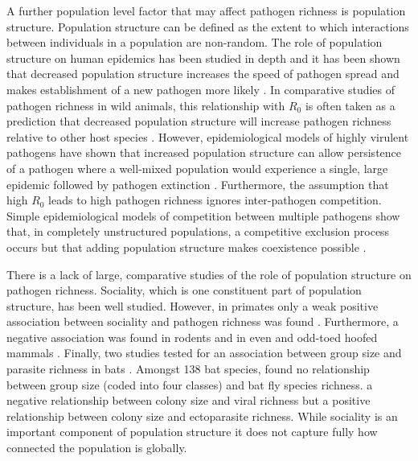 

A further population level factor that may affect pathogen richness is population structure.
Population structure can be defined as the extent to which interactions between individuals in a population are non-random.
The role of population structure on human epidemics has been studied in depth and it has been shown that decreased population structure increases the speed of pathogen spread and makes establishment of a new pathogen more likely \cite{colizza2007invasion, vespignani2008reaction}.
In comparative studies of pathogen richness in wild animals, this relationship with $R_0$ is often taken as a prediction that decreased population structure will increase pathogen richness relative to other host species \cite{nunn2003comparative, morand2000wormy, poulin2014parasite, poulin2000diversity, altizer2003social}. 
However, epidemiological models of highly virulent pathogens have shown that increased population structure can allow persistence of a pathogen where a well-mixed population would experience a single, large epidemic followed by pathogen extinction \cite{blackwood2013resolving, plowright2011urban}.
Furthermore, the assumption that high $R_0$ leads to high pathogen richness ignores inter-pathogen competition.
Simple epidemiological models of competition between multiple pathogens show that, in completely unstructured populations, a competitive exclusion process occurs but that adding population structure makes coexistence possible \cite{qiu2013vector, allen2004sis, nunes2006localized}.




There is a lack of large, comparative studies of the role of population structure on pathogen richness.
Sociality, which is one constituent part of population structure, has been well studied.
However, in primates only a weak positive association between sociality and pathogen richness was found \cite{vitone2004body}.
Furthermore, a negative association was found in rodents \cite{bordes2007rodent} and in even and odd-toed hoofed mammals \cite{ezenwa2006host}.
Finally, two studies tested for an association between group size and parasite richness in bats \cite{bordes2008bat, gay2014parasite}.
Amongst 138 bat species, \textcite{bordes2008bat} found no relationship between group size (coded into four classes) and bat fly species richness.
\textcite{gay2014parasite} a negative relationship between colony size and viral richness but a positive relationship between colony size and ectoparasite richness.
While sociality is an important component of population structure it does not capture fully how connected the population is globally. 


